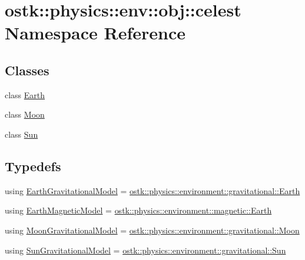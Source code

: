 \hypertarget{namespaceostk_1_1physics_1_1env_1_1obj_1_1celest}{}\section{ostk\+:\+:physics\+:\+:env\+:\+:obj\+:\+:celest Namespace Reference}
\label{namespaceostk_1_1physics_1_1env_1_1obj_1_1celest}
\subsection*{Classes}
\begin{DoxyCompactItemize}
\item 
class \hyperlink{classostk_1_1physics_1_1env_1_1obj_1_1celest_1_1_earth}{Earth}
\item 
class \hyperlink{classostk_1_1physics_1_1env_1_1obj_1_1celest_1_1_moon}{Moon}
\item 
class \hyperlink{classostk_1_1physics_1_1env_1_1obj_1_1celest_1_1_sun}{Sun}
\end{DoxyCompactItemize}
\subsection*{Typedefs}
\begin{DoxyCompactItemize}
\item 
using \hyperlink{namespaceostk_1_1physics_1_1env_1_1obj_1_1celest_afb7c5d16d89de6cfcf563f89088f69c5}{Earth\+Gravitational\+Model} = \hyperlink{classostk_1_1physics_1_1environment_1_1gravitational_1_1_earth}{ostk\+::physics\+::environment\+::gravitational\+::\+Earth}
\item 
using \hyperlink{namespaceostk_1_1physics_1_1env_1_1obj_1_1celest_ac56a1ac811d11e06caa66c76debac944}{Earth\+Magnetic\+Model} = \hyperlink{classostk_1_1physics_1_1environment_1_1magnetic_1_1_earth}{ostk\+::physics\+::environment\+::magnetic\+::\+Earth}
\item 
using \hyperlink{namespaceostk_1_1physics_1_1env_1_1obj_1_1celest_afb39e52f5f405d447dae9362c9bdce04}{Moon\+Gravitational\+Model} = \hyperlink{classostk_1_1physics_1_1environment_1_1gravitational_1_1_moon}{ostk\+::physics\+::environment\+::gravitational\+::\+Moon}
\item 
using \hyperlink{namespaceostk_1_1physics_1_1env_1_1obj_1_1celest_aeda0998cad8c59ab75aaf5f6ba0023f6}{Sun\+Gravitational\+Model} = \hyperlink{classostk_1_1physics_1_1environment_1_1gravitational_1_1_sun}{ostk\+::physics\+::environment\+::gravitational\+::\+Sun}
\end{DoxyCompactItemize}


